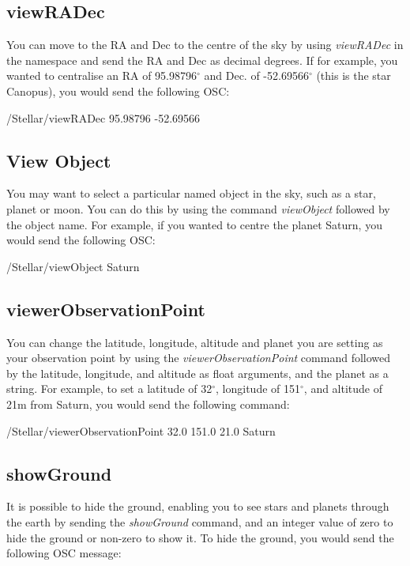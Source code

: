 \subsection{viewRADec}
You can move to the RA and Dec to the centre of the sky by using  \textit{viewRADec} in the namespace and send the RA and Dec as decimal degrees. If for example, you wanted to centralise  an RA of 95.98796$^{\circ}$  and Dec. of -52.69566$^{\circ}$  (this is the star Canopus), you would send the following OSC:
 \begin{syntax}	
 	\medskip
 	/Stellar/viewRADec 95.98796 -52.69566
 	\medskip
 \end{syntax}
 
 \subsection{View Object}
 You may want to select a particular named object in the sky, such as a star, planet or moon. You can do this by using the command \textit{viewObject} followed by the object name. For example, if you wanted to centre the planet Saturn, you would send the following OSC:
 
\begin{syntax}	
 	\medskip
 	 /Stellar/viewObject Saturn
 	\medskip
 \end{syntax}
 
 \subsection{viewerObservationPoint}
 You can change the latitude, longitude, altitude and planet you are setting as your observation point by using the \textit{viewerObservationPoint} command followed by the latitude, longitude, and altitude as float arguments, and the planet as a string.  For example, to set a latitude of 32$^{\circ}$, longitude of 151$^{\circ}$, and altitude of 21m from Saturn, you would send the following command:
 
 \begin{syntax}	
 	\medskip
 	/Stellar/viewerObservationPoint 32.0 151.0 21.0 Saturn
 	\medskip
 \end{syntax}
 
 
 \subsection{showGround }
 It is possible to hide the ground, enabling you to see stars and planets through the earth by sending the \textit{showGround } command, and an integer value of zero to hide the ground or non-zero to show it. To hide the ground, you would send the following OSC message:
 
